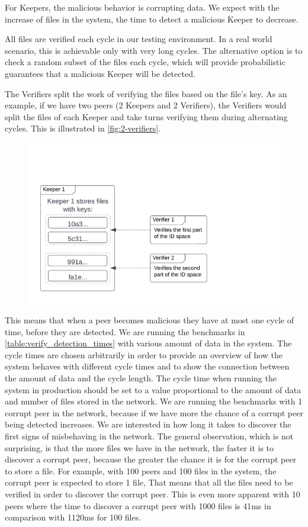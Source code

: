 For Keepers, the malicious behavior is corrupting data.
We expect with the increase of files in the system, the time to detect a malicious Keeper to decrease.

All files are verified each cycle in our testing environment.
In a real world scenario, this is achievable only with very long cycles.
The alternative option is to check a random subset of the files each cycle,
which will provide probabilistic guarantees that a malicious Keeper will be detected.

The Verifiers split the work of verifying the files based on the file's key.
As an example, if we have two peers (2 Keepers and 2 Verifiers),
the Verifiers would split the files of each Keeper and take turns verifying them
during alternating cycles.
This is illustrated in \autoref{fig:2-verifiers}.

\begin{figure}
    \centering
    \includegraphics[width=350pt]{gfx/2-verifiers.png}
    \label{fig:2-verifiers}
\end{figure}

This means that when a peer becomes malicious they have at most one cycle of time,
before they are detected.
We are running the benchmarks in \autoref{table:verify_detection_times} with various amount of data in the system.
The cycle times are chosen arbitrarily in order to provide an overview of how the system behaves with
different cycle times and to show the connection between the amount of data and the cycle length.
The cycle time when running the system in production should be set to a value proportional to
the amount of data and number of files stored in the network.
We are running the benchmarks with 1 corrupt peer in the network,
because if we have more the chance of a corrupt peer being detected increases.
We are interested in how long it takes to discover the first signs of misbehaving in the network.
The general observation, which is not surprising, is that the more files we have in the network,
the faster it is to discover a corrupt peer,
because the greater the chance it is for the corrupt peer to store a file.
For example, with 100 peers and 100 files in the system, the corrupt peer is expected to store 1 file,
That means that all the files need to be verified in order to discover the corrupt peer.
This is even more apparent with 10 peers where the time to discover a corrupt peer with 1000 files is
41ms in comparison with 1120ms for 100 files.

